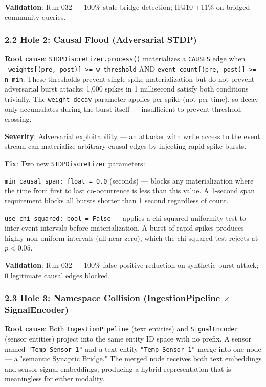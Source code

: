 \textbf{Validation}: Run 032 --- 100\% stale bridge detection; H@10 +11\% on bridged-community queries.

\subsubsection*{2.2 Hole 2: Causal Flood (Adversarial STDP)}

\textbf{Root cause}: \texttt{STDPDiscretizer.process()} materializes a \texttt{CAUSES} edge when \texttt{\_weights[(pre, post)] >= w\_threshold} AND \texttt{event\_count[(pre, post)] >= n\_min}. These thresholds prevent single-spike materialization but do not prevent adversarial burst attacks: 1,000 spikes in 1 millisecond satisfy both conditions trivially. The \texttt{weight\_decay} parameter applies per-spike (not per-time), so decay only accumulates during the burst itself --- insufficient to prevent threshold crossing.

\textbf{Severity}: Adversarial exploitability --- an attacker with write access to the event stream can materialize arbitrary causal edges by injecting rapid spike bursts.

\textbf{Fix}: Two new \texttt{STDPDiscretizer} parameters:

\texttt{min\_causal\_span: float = 0.0} (seconds) --- blocks any materialization where the time from first to last co-occurrence is less than this value. A 1-second span requirement blocks all bursts shorter than 1 second regardless of count.

\texttt{use\_chi\_squared: bool = False} --- applies a chi-squared uniformity test to inter-event intervals before materialization. A burst of rapid spikes produces highly non-uniform intervals (all near-zero), which the chi-squared test rejects at $p < 0.05$.

\textbf{Validation}: Run 032 --- 100\% false positive reduction on synthetic burst attack; 0 legitimate causal edges blocked.

\subsubsection*{2.3 Hole 3: Namespace Collision (IngestionPipeline $\times$ SignalEncoder)}

\textbf{Root cause}: Both \texttt{IngestionPipeline} (text entities) and \texttt{SignalEncoder} (sensor entities) project into the same entity ID space with no prefix. A sensor named \texttt{"Temp\_Sensor\_1"} and a text entity \texttt{"Temp\_Sensor\_1"} merge into one node --- a "semantic Synaptic Bridge." The merged node receives both text embeddings and sensor signal embeddings, producing a hybrid representation that is meaningless for either modality.

